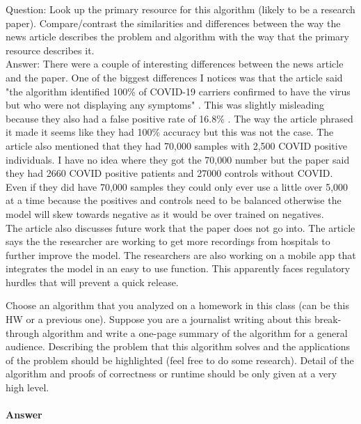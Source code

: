 \documentclass{article}
\begin{document}
	Question: Look up the primary resource for this algorithm (likely to be a research paper).
	Compare/contrast the similarities and differences between the way the news article describes the problem and algorithm with the way that the primary resource describes it.\\
	Answer:
	There were a couple of interesting differences between the news article and the paper. One of the biggest differences I notices was that the article said "the algorithm identified 100\% of COVID-19 carriers confirmed to have the virus but who were not displaying any symptoms" \cite{osborne_2020}. This was slightly misleading because they also had a false positive rate of 16.8\% \cite{9208795}. The way the article phrased it made it seems like they had 100\% accuracy but this was not the case. The article also mentioned that they had 70,000 samples with 2,500 COVID positive individuals. I have no idea where they got the 70,000 number but the paper said they had 2660 COVID positive patients and 27000 controls without COVID. Even if they did have 70,000 samples they could only ever use a little over 5,000 at a time because the positives and controls need to be balanced otherwise the model will skew towards negative as it would be over trained on negatives. \\
	The article also discusses future work that the paper does not go into. The article says the the researcher are working to get more recordings from hospitals to further improve the model. The researchers are also working on a mobile app that integrates the model in an easy to use function. This apparently faces regulatory hurdles that will prevent a quick release.
	



\nextprob
{}

Choose an algorithm that you analyzed on a homework in this class (can be this HW or a previous one).
Suppose you are a journalist writing about this break-through algorithm and write a one-page summary of the algorithm for a general audience.
Describing the problem that this algorithm solves and the applications of the problem should be highlighted (feel free to do some research).
Detail of the algorithm and proofs of correctness or runtime should be only given at a very high level.

\paragraph{Answer}
\end{document}
